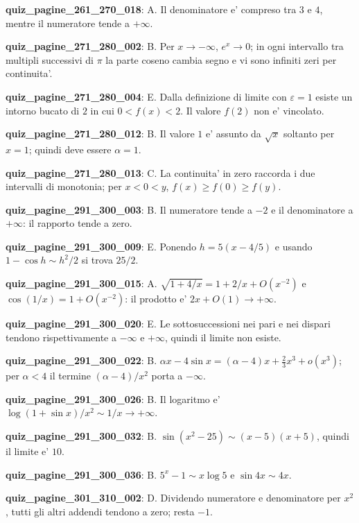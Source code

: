 \documentclass[11pt,a4paper]{article}
\newcounter{quiz}
\begin{document}
\noindent\textbf{quiz\_pagine\_261\_270\_018}: A. Il denominatore e' compreso tra $3$ e $4$, mentre il numeratore tende a $+\infty$.\par\medskip
\noindent\textbf{quiz\_pagine\_271\_280\_002}: B. Per $x\to-\infty$, $e^x\to0$; in ogni intervallo tra multipli successivi di $\pi$ la parte coseno cambia segno e vi sono infiniti zeri per continuita'.\par\medskip
\noindent\textbf{quiz\_pagine\_271\_280\_004}: E. Dalla definizione di limite con $\varepsilon=1$ esiste un intorno bucato di $2$ in cui $0<f(x)<2$. Il valore $f(2)$ non e' vincolato.\par\medskip
\noindent\textbf{quiz\_pagine\_271\_280\_012}: B. Il valore $1$ e' assunto da $\sqrt x$ soltanto per $x=1$; quindi deve essere $\alpha=1$.\par\medskip
\noindent\textbf{quiz\_pagine\_271\_280\_013}: C. La continuita' in zero raccorda i due intervalli di monotonia; per $x<0<y$, $f(x)\geq f(0)\geq f(y)$.\par\medskip
\noindent\textbf{quiz\_pagine\_291\_300\_003}: B. Il numeratore tende a $-2$ e il denominatore a $+\infty$: il rapporto tende a zero.\par\medskip
\noindent\textbf{quiz\_pagine\_291\_300\_009}: E. Ponendo $h=5(x-4/5)$ e usando $1-\cos h\sim h^2/2$ si trova $25/2$.\par\medskip
\noindent\textbf{quiz\_pagine\_291\_300\_015}: A. $\sqrt{1+4/x}=1+2/x+O(x^{-2})$ e $\cos(1/x)=1+O(x^{-2})$: il prodotto e' $2x+O(1)\to+\infty$.\par\medskip
\noindent\textbf{quiz\_pagine\_291\_300\_020}: E. Le sottosuccessioni nei pari e nei dispari tendono rispettivamente a $-\infty$ e $+\infty$, quindi il limite non esiste.\par\medskip
\noindent\textbf{quiz\_pagine\_291\_300\_022}: B. $\alpha x-4\sin x=(\alpha-4)x+\frac23x^3+o(x^3)$; per $\alpha<4$ il termine $(\alpha-4)/x^2$ porta a $-\infty$.\par\medskip
\noindent\textbf{quiz\_pagine\_291\_300\_026}: B. Il logaritmo e' $\log(1+\sin x)/x^2\sim1/x\to+\infty$.\par\medskip
\noindent\textbf{quiz\_pagine\_291\_300\_032}: B. $\sin(x^2-25)\sim(x-5)(x+5)$, quindi il limite e' $10$.\par\medskip
\noindent\textbf{quiz\_pagine\_291\_300\_036}: B. $5^x-1\sim x\log5$ e $\sin4x\sim4x$.\par\medskip
\noindent\textbf{quiz\_pagine\_301\_310\_002}: D. Dividendo numeratore e denominatore per $x^2$, tutti gli altri addendi tendono a zero; resta $-1$.\par\medskip
\end{document}
